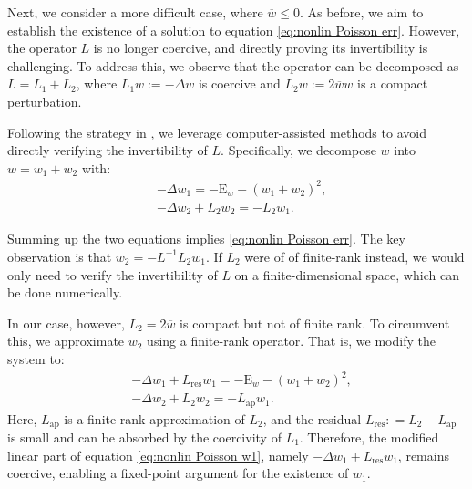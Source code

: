 \documentclass[11pt,a4paper]{article}
\numberwithin{equation}{section}
\newcommand{\Epsilon}{\mathrm{E}}
\newcommand{\assign}{:=}
\newcommand{\tmop}[1]{\ensuremath{\operatorname{#1}}}
\begin{document}
Next, we consider a more difficult case, where $\overline{w} \leqslant 0$. As
before, we aim to establish the existence of a solution to equation
\eqref{eq:nonlin Poisson err}. However, the operator $L$ is no longer
coercive, and directly proving its invertibility is challenging. To address
this, we observe that the operator can be decomposed as $L = L_1 + L_2$, where
$L_1 w \assign - \Delta w$ is coercive and $L_2 w \assign  2 \overline{w}
w$ is a compact perturbation.

Following the strategy in {\cite{chen2022stable}}, we leverage
computer-assisted methods to avoid directly verifying the invertibility of
$L$. Specifically, we decompose $w$ into $w = w_1 + w_2$ with:
\[\begin{aligned}
    &- \Delta w_1  =  - \Epsilon_w - (w_1 + w_2)^2,  \\
  &- \Delta w_2 + L_2 w_2  =  -L_2 w_1 .  
\end{aligned}\]

Summing up the two equations implies
 \eqref{eq:nonlin Poisson err}. The key observation is that $w_2 =
-L^{- 1} L_2 w_1$. If $L_2$ were of of finite-rank instead, %
we would only need to verify the invertibility of $L$ on a
finite-dimensional space, which can be done numerically.

In our case, however, $L_2 =  2 \overline{w}$ is compact but not of finite rank.
To circumvent this, we approximate $w_2$ using a finite-rank operator. That
is, we modify the system to:
\begin{align}
  &- \Delta w_1 + L_{\tmop{res}} w_1  =  - \Epsilon_w - (w_1 + w_2)^2, 
  \label{eq:nonlin Poisson w1}\\
  &- \Delta w_2 + L_2 w_2  =  - L_{\tmop{ap}} w_1 .  \label{eq:nonlin
  Poisson w2}
\end{align}
Here, $ L_{\tmop{ap}}$ is a finite rank approximation of $L_2$, and the
residual $ L_{\tmop{res}} : = L_2 - L_{\tmop{ap}}$ is small and can be
absorbed by the coercivity of $L_1$. Therefore, the modified linear part of
equation \eqref{eq:nonlin Poisson w1}, namely $- \Delta w_1 + L_{\tmop{res}} w_1$, remains coercive,  enabling a fixed-point argument for the existence
of $w_1$.
\end{document}
